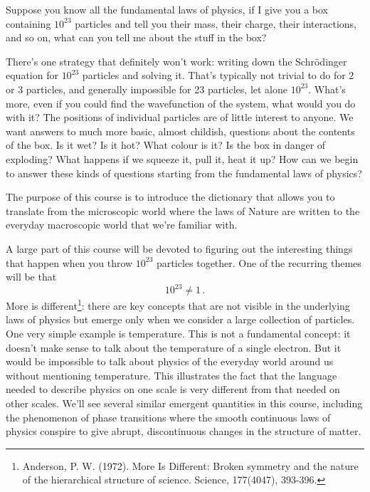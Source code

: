 \documentclass{article}
\theoremstyle{plain}\theoremheaderfont{\normalfont\bfseries}\theorembodyfont{\rmfamily}\theoremseparator{.}\newtheorem*{thm}{Theorem}\newtheorem*{law}{Law}\newtheorem*{pos}{Postulate}
\numberwithin{equation}{section}
\begin{document}
    Suppose you know all the fundamental laws of physics, if I give you a box containing \(10^{23}\) particles and tell you their mass, their charge, their interactions, and so on, what can you tell me about the stuff in the box?

    There's one strategy that definitely won't work: writing down the Schr\"{o}dinger equation for \(10^{23}\) particles and solving it. That's typically not trivial to do for 2 or 3 particles, and generally impossible for 23 particles, let alone \(10^{23}\). What's more, even if you could find the wavefunction of the system, what would you do with it? The positions of individual particles are of little interest to anyone. We want answers to much more basic, almost childish, questions about the contents of the box. Is it wet? Is it hot? What colour is it? Is the box in danger of exploding? What happens if we squeeze it, pull it, heat it up? How can we begin to answer these kinds of questions starting from the fundamental laws of physics?

    The purpose of this course is to introduce the dictionary that allows you to translate from the microscopic world where the laws of Nature are written to the everyday macroscopic world that we're familiar with. 

    A large part of this course will be devoted to figuring out the interesting things that happen when you throw \(10^{23}\) particles together. One of the recurring themes will be that
    \begin{equation}
        10^{23}\ne 1\,.
    \end{equation}
    More is different\footnote{Anderson, P. W. (1972). More Is Different: Broken symmetry and the nature of the hierarchical structure of science. Science, 177(4047), 393-396.}: there are key concepts that are not visible in the underlying laws of physics but emerge only when we consider a large collection of particles. One very simple example is temperature. This is not a fundamental concept: it doesn't make sense to talk about the temperature of a single electron. But it would be impossible to talk about physics of the everyday world around us without mentioning temperature. This illustrates the fact that the language needed to describe physics on one scale is very different from that needed on other scales. We'll see several similar emergent quantities in this course, including the phenomenon of phase transitions where the smooth continuous laws of physics conspire to give abrupt, discontinuous changes in the structure of matter.
\end{document}
